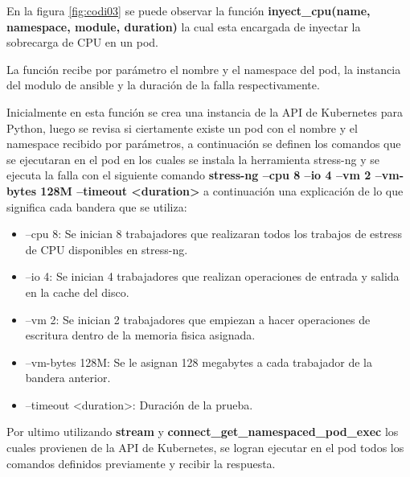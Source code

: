 \par En la figura \ref{fig:codi03} se puede observar la función \textbf{ inyect\_cpu(name, namespace, module, duration)} la cual esta encargada de inyectar la sobrecarga de CPU en un pod.\\
\par La función recibe por parámetro el nombre y el namespace del pod, la instancia del modulo de ansible y la duración de la falla respectivamente. \\
\par Inicialmente en esta función se crea una instancia de la API de Kubernetes para Python, luego se revisa si ciertamente existe un pod con el nombre y el namespace recibido por parámetros, a continuación se definen los comandos que se ejecutaran en el pod en los cuales se instala la herramienta stress-ng y se ejecuta la falla con el siguiente comando 
\textbf{stress-ng --cpu 8 --io 4 --vm 2 --vm-bytes 128M --timeout <duration>} a continuación una explicación de lo que significa cada bandera que se utiliza:
\begin{itemize}
        \item --cpu 8: Se inician 8 trabajadores que realizaran todos los trabajos de estress de CPU disponibles en stress-ng.
        \item --io 4: Se inician 4 trabajadores que realizan operaciones de entrada y salida en la cache del disco.
        \item --vm 2: Se inician 2 trabajadores que empiezan a hacer operaciones de escritura dentro de la memoria fisica asignada.        
        \item --vm-bytes 128M: Se le asignan 128 megabytes a cada trabajador de la bandera anterior.
        \item --timeout <duration>: Duración de la prueba.\\
    \end{itemize}

\par Por ultimo utilizando \textbf{stream} y \textbf{connect\_get\_namespaced\_pod\_exec} los cuales provienen de la API de Kubernetes, se logran ejecutar en el pod todos los comandos definidos previamente y recibir la respuesta.\\

